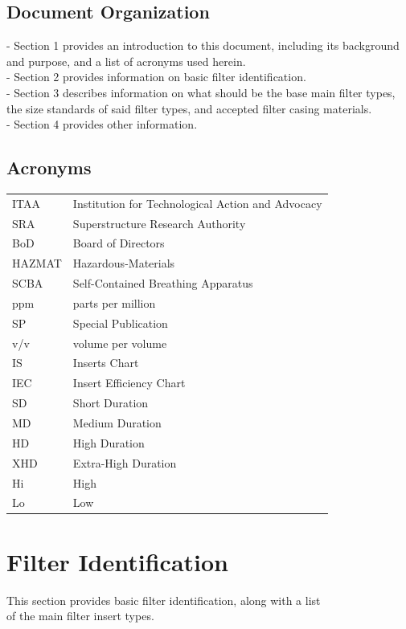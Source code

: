 \documentclass[a4paper, 12pt, oneside]{article}
\begin{document}
{		\subsection{Document Organization}
			- Section 1 provides an introduction to this document, including its background and purpose, and a list of acronyms used herein. \\
			- Section 2 provides information on basic filter identification. \\
			- Section 3 describes information on what should be the base main filter types, the size standards of said filter types, and accepted filter casing materials. \\
			- Section 4 provides other information.
		\subsection{Acronyms}
			\begin{tabular}{|p{2cm} p{10cm}}
				ITAA & Institution for Technological Action and Advocacy \\
				SRA & Superstructure Research Authority \\
				BoD & Board of Directors \\
				HAZMAT & Hazardous-Materials \\
				SCBA & Self-Contained Breathing Apparatus \\
				ppm & parts per million \\
				SP & Special Publication \\
				v/v & volume per volume \\
				IS & Inserts Chart \\
				IEC & Insert Efficiency Chart \\
				SD & Short Duration \\
				MD & Medium Duration \\
				HD & High Duration \\
				XHD & Extra-High Duration \\
				Hi & High \\
				Lo & Low \\
			\end{tabular}
			
			
	\newpage
			
	\section{Filter Identification}
		This section provides basic filter identification, along with a list \\
		of the main filter insert types.
}
\end{document}
